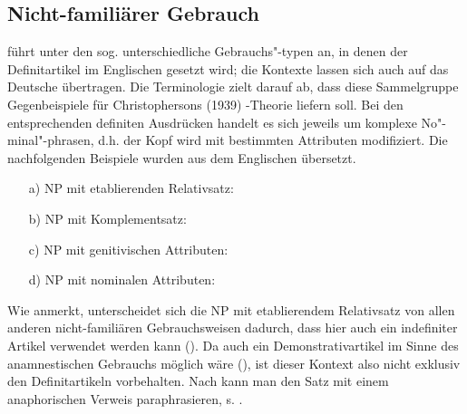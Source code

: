 \subsection{Nicht-familiärer Gebrauch}\label{sec:nicht-fam}

\textcite[130--149]{Hawkins1978} führt unter den sog.  unterschiedliche Gebrauchs"-typen an, in denen der Definitartikel im Englischen gesetzt wird; die Kontexte lassen sich auch auf das Deutsche übertragen. Die Terminologie zielt darauf ab, dass diese Sammelgruppe Gegenbeispiele für Christophersons (1939) -Theorie liefern soll. Bei den entsprechenden definiten Ausdrücken handelt es sich jeweils um komplexe No"-minal"-phrasen, d.h. der Kopf wird mit bestimmten Attributen modifiziert. Die nachfolgenden Beispiele \parencite[vgl. die Übersicht in][37]{Himmelmann1997} wurden aus dem Englischen übersetzt.
 
\begin{itemize} 
		\item[a)] \label{etab} NP mit etablierenden Relativsatz: \\  
		\item[b)] \label{komp} NP mit Komplementsatz: \\  
		\item[c)] \label{gen-attr} NP mit genitivischen Attributen: \\ 
		\item[d)] \label{n-attr} NP mit nominalen Attributen: \\ 
\end{itemize}

Wie \textcite[38]{Himmelmann1997} anmerkt, unterscheidet sich die NP mit etablierendem Relativsatz von allen anderen nicht-familiären Gebrauchsweisen dadurch, dass hier auch ein indefiniter Artikel verwendet werden kann (). Da auch ein Demonstrativartikel im Sinne des anamnestischen Gebrauchs möglich wäre (), ist dieser Kontext also nicht exklusiv den Definitartikeln vorbehalten. Nach \textcite[308]{Lobner1985} kann man den Satz mit einem anaphorischen Verweis paraphrasieren, s. . %


